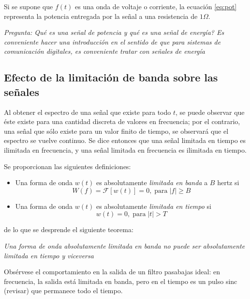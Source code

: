 \documentclass[12pt,letterpaper,titlepage,twoside]{book}
\begin{document}
Si se supone que $f(t)$ es una onda de voltaje o corriente, la ecuación \ref{eq:pot} representa la potencia entregada por la señal a una resistencia de $1 \Omega$.

\emph{Pregunta: Qué es una señal de potencia y qué es una señal de energía?  Es conveniente hacer una introducción en el sentido de que para sistemas de comunicación digitales, es conveniente tratar con señales de energía}


\subsection{Efecto de la limitación de banda sobre las señales}

Al obtener el espectro de una señal que existe para todo $t$, se puede observar que éste existe para una cantidad discreta de valores en frecuencia; por el contrario, una señal que sólo existe para un valor finito de tiempo, se observará que el espectro se vuelve continuo. Se dice entonces que una señal limitada en tiempo es ilimitada en frecuencia, y una señal limitada en frecuencia es ilimitada en tiempo.

Se proporcionan las siguientes definiciones: 

\begin{itemize}
\item Una forma de onda $w(t)$ es absolutamente \textit{limitada en banda }a $B$  hertz si
\begin{equation}
W(f) = \mathcal{F} \left[ w(t) \right] = 0, \; \text{para} \; \vert f \vert  \geqslant B
\end{equation}
\item Una forma de onda $w(t)$ es absolutamente \textit{limitada en tiempo } si
\begin{equation}
w(t) = 0, \; \text{para} \; \vert t \vert  > T
\end{equation}

\end{itemize}

de lo que se desprende el siguiente teorema:

\emph{Una forma de onda absolutamente limitada en banda no puede ser absolutamente limitada en tiempo y viceversa}


Obsérvese el comportamiento en la salida de un filtro pasabajas ideal: en frecuencia, la salida está limitada en banda, pero en el tiempo es un pulso sinc (revisar) que permanece todo el tiempo.
\end{document}
